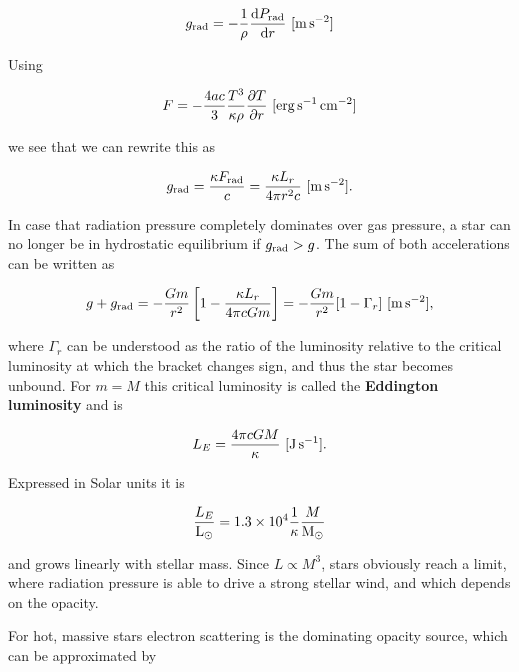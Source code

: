 \documentclass[a4paper,10pt]{article}
\begin{document}
\begin{align*}
    g_{\rm rad} = -\frac{1}{\rho} \frac{{\rm d}P_{\rm rad}}{{\rm d}r} ~ [{\rm m\,s^{-2}}]
\end{align*}

{\noindent}Using 

\begin{align*}
    F = -\frac{4ac}{3} \frac{T^3}{\kappa\rho}\frac{\partial T}{\partial r} ~ [{\rm erg\,s^{-1}\,cm^{-2}}]
\end{align*}

we see that we can rewrite this as

\begin{align*}
    g_{\rm rad} = \frac{\kappa F_{\rm rad}}{c} = \frac{\kappa L_r}{4\pi r^2c} ~ [{\rm m\,s^{-2}}].
\end{align*}

{\noindent}In case that radiation pressure completely dominates over gas pressure, a star can no longer be in hydrostatic equilibrium if $g_{\rm rad}>g$. The sum of both accelerations can be written as

\begin{align*}
    g+g_{\rm rad} = -\frac{Gm}{r^2} \left[ 1-\frac{\kappa L_r}{4\pi cGm} \right] = -\frac{Gm}{r^2}[1-\Gamma_r] ~ [{\rm m\,s^{-2}}],
\end{align*}

{\noindent}where $\Gamma_r$ can be understood as the ratio of the luminosity relative to the critical luminosity at which the bracket changes sign, and thus the star becomes unbound. For $m=M$ this critical luminosity is called the \textbf{Eddington luminosity} and is

\begin{align*}
    L_E = \frac{4\pi cGM}{\kappa} ~ [{\rm J\,s^{-1}}].
\end{align*}

{\noindent}Expressed in Solar units it is

\begin{align*}
    \frac{L_E}{{\rm L_\odot}} = 1.3\times10^4\frac{1}{\kappa} \frac{M}{{\rm M_\odot}}
\end{align*}

{\noindent}and grows linearly with stellar mass. Since $L\propto M^3$, stars obviously reach a limit, where radiation pressure is able to drive a strong stellar wind, and which depends on the opacity.

{\noindent}For hot, massive stars electron scattering is the dominating opacity source, which can be approximated by
\end{document}
